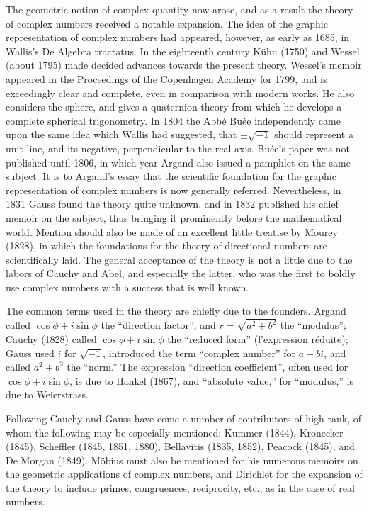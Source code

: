 \documentclass[oneside]{book}
\begin{document}
{The geometric notion of complex quantity now arose, and as a result
the theory of complex numbers received a notable expansion. The idea
of the graphic representation of complex numbers had appeared,
however, as early as 1685, in Wallis's De Algebra tractatus. In the
eighteenth century K\"uhn (1750) and Wessel (about 1795) made
decided advances towards the present theory. Wessel's memoir
appeared in the Proceedings of the Copenhagen Academy for 1799, and
is exceedingly clear and complete, even in comparison with modern
works. He also considers the sphere, and gives a quaternion theory
from which he develops a complete spherical trigonometry. In 1804
the Abb\'e Bu\'ee independently came upon the same idea which Wallis
had suggested, that $\pm\sqrt{-1}$ should represent a unit line, and
its negative, perpendicular to the real axis. Bu\'ee's paper was
not published until 1806, in which year Argand also issued a
pamphlet on the same subject. It is to Argand's essay that the
scientific foundation for the graphic representation of complex
numbers is now generally referred. Nevertheless, in 1831 Gauss
found the theory quite unknown, and in 1832 published his chief
memoir on the subject, thus bringing it prominently before the
mathematical world. Mention should also be made of an excellent
little treatise by Mourey (1828), in which the foundations for the
theory of directional numbers are scientifically laid. The general
acceptance of the theory is not a little due to the labors of Cauchy
and Abel, and especially the latter, who was the first to boldly use
complex numbers with a success that is well known.

The common terms used in the theory are chiefly due to the
founders. Argand called $\cos \phi + i \sin \phi$ the ``direction
factor'', and $r = \sqrt{a^2+b^2}$ the ``modulus''; Cauchy (1828)
called $\cos \phi + i \sin \phi$ the ``reduced form'' (l'expression
r\'eduite); Gauss used $i$ for $\sqrt{-1}$, introduced the term
``complex number'' for $a+bi$, and called $a^2+b^2$ the ``norm.'' The
expression ``direction coefficient'', often used for $\cos \phi + i
\sin \phi$, is due to Hankel (1867), and ``absolute value,'' for
``modulus,'' is due to Weierstrass.

Following Cauchy and Gauss have come a number of contributors of
high rank, of whom the following may be especially mentioned: Kummer
(1844), Kronecker (1845), Scheffler (1845, 1851, 1880), Bellavitis
(1835, 1852), Peacock (1845), and De Morgan (1849). M\"obius must
also be mentioned for his numerous memoirs on the geometric
applications of complex numbers, and Dirichlet for the expansion of
the theory to include primes, congruences, reciprocity, etc., as in
the case of real numbers.

}
\end{document}
